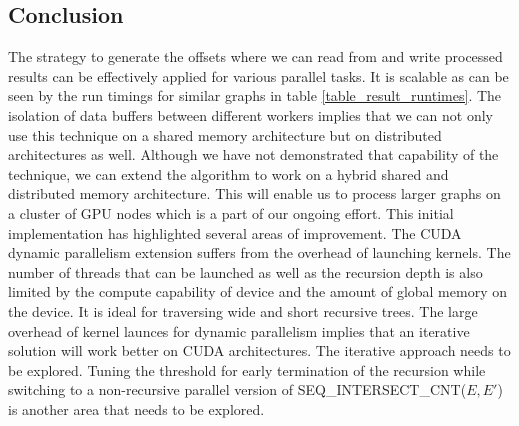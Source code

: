 \documentclass[conference]{IEEEtran}
\begin{document}
\subsection{Conclusion}
The strategy to generate the offsets where we can read from and write processed results can be effectively applied for various parallel tasks. It is scalable as can be seen by the run timings for similar graphs in table \ref{table_result_runtimes}. The isolation of data buffers between different workers implies that we can not only use this technique on a shared memory architecture but on distributed architectures as well. Although we have not demonstrated that capability of the technique, we can extend the algorithm to work on a hybrid shared and distributed memory architecture. This will enable us to process larger graphs on a cluster of GPU nodes which is a part of our ongoing effort. This initial implementation has highlighted several areas of improvement. The CUDA dynamic parallelism extension suffers from the overhead of launching kernels. The number of threads that can be launched as well as the recursion depth is also limited by the compute capability of device\cite{b21} and the amount of global memory on the device. It is ideal for traversing wide and short recursive trees. The large overhead of kernel launces for dynamic parallelism implies that an iterative solution will work better on CUDA architectures. The iterative approach needs to be explored. Tuning the threshold for early termination of the recursion while switching to a non-recursive parallel version of SEQ\_INTERSECT\_CNT($E, E'$) is another area that needs to be explored.
\end{document}
